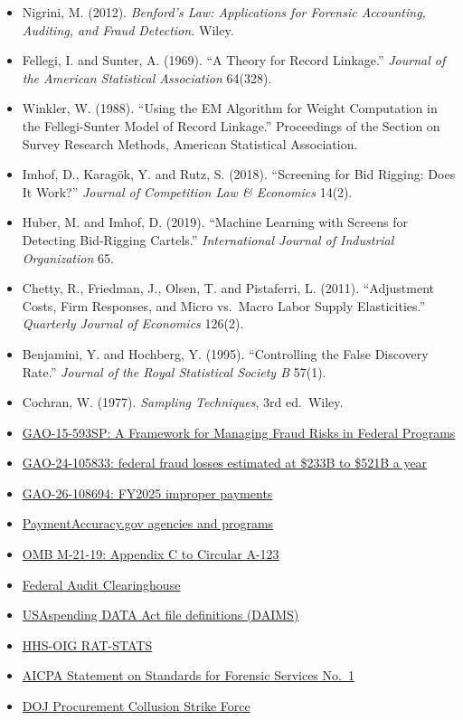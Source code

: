 \documentclass[letterpaper,11pt]{article}
\providecommand{\tightlist}{\setlength{\itemsep}{0pt}\setlength{\parskip}{0pt}}
\begin{document}
\begin{itemize}
\tightlist
\item
  Nigrini, M. (2012). \emph{Benford's Law: Applications for Forensic
  Accounting, Auditing, and Fraud Detection.} Wiley.
\item
  Fellegi, I. and Sunter, A. (1969). ``A Theory for Record Linkage.''
  \emph{Journal of the American Statistical Association} 64(328).
\item
  Winkler, W. (1988). ``Using the EM Algorithm for Weight Computation in
  the Fellegi-Sunter Model of Record Linkage.'' Proceedings of the
  Section on Survey Research Methods, American Statistical Association.
\item
  Imhof, D., Karagök, Y. and Rutz, S. (2018). ``Screening for Bid
  Rigging: Does It Work?'' \emph{Journal of Competition Law \&
  Economics} 14(2).
\item
  Huber, M. and Imhof, D. (2019). ``Machine Learning with Screens for
  Detecting Bid-Rigging Cartels.'' \emph{International Journal of
  Industrial Organization} 65.
\item
  Chetty, R., Friedman, J., Olsen, T. and Pistaferri, L. (2011).
  ``Adjustment Costs, Firm Responses, and Micro vs.~Macro Labor Supply
  Elasticities.'' \emph{Quarterly Journal of Economics} 126(2).
\item
  Benjamini, Y. and Hochberg, Y. (1995). ``Controlling the False
  Discovery Rate.'' \emph{Journal of the Royal Statistical Society B}
  57(1).
\item
  Cochran, W. (1977). \emph{Sampling Techniques}, 3rd ed.~Wiley.
\item
  \href{https://www.gao.gov/products/gao-15-593sp}{GAO-15-593SP: A
  Framework for Managing Fraud Risks in Federal Programs}
\item
  \href{https://www.gao.gov/products/GAO-24-105833}{GAO-24-105833:
  federal fraud losses estimated at \$233B to \$521B a year}
\item
  \href{https://www.gao.gov/products/gao-26-108694}{GAO-26-108694:
  FY2025 improper payments}
\item
  \href{https://paymentaccuracy.gov/agencies-and-programs}{PaymentAccuracy.gov
  agencies and programs}
\item
  \href{https://www.whitehouse.gov/wp-content/uploads/2021/03/M-21-19.pdf}{OMB
  M-21-19: Appendix C to Circular A-123}
\item
  \href{https://www.fac.gov/}{Federal Audit Clearinghouse}
\item
  \href{https://fiscal.treasury.gov/data-transparency/DAIMS-current.html}{USAspending
  DATA Act file definitions (DAIMS)}
\item
  \href{https://oig.hhs.gov/compliance/rat-stats/}{HHS-OIG RAT-STATS}
\item
  \href{https://www.aicpa-cima.com/resources/download/statement-on-standards-for-forensic-services}{AICPA
  Statement on Standards for Forensic Services No.~1}
\item
  \href{https://www.justice.gov/procurement-collusion-strike-force}{DOJ
  Procurement Collusion Strike Force}
\end{itemize}
\end{document}
